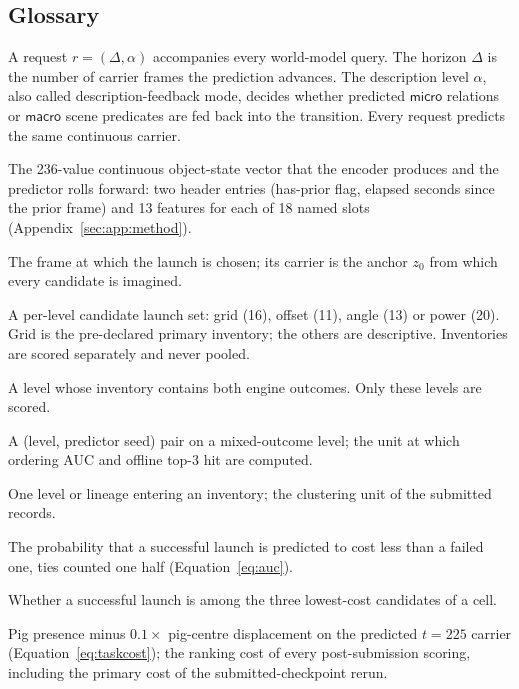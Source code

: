 \begin{revblock}
\subsection{Glossary}

\begin{description}[leftmargin=1em, itemsep=1pt]
\item[Request, horizon, description-feedback mode.] A request $r=(\Delta,\alpha)$ accompanies every world-model query. The horizon $\Delta$ is the number of carrier frames the prediction advances. The description level $\alpha$, also called description-feedback mode, decides whether predicted $\textsf{micro}$ relations or $\textsf{macro}$ scene predicates are fed back into the transition. Every request predicts the same continuous carrier.
\item[Carrier.] The 236-value continuous object-state vector that the encoder produces and the predictor rolls forward: two header entries (has-prior flag, elapsed seconds since the prior frame) and 13 features for each of 18 named slots (Appendix~\ref{sec:app:method}).
\item[Decision frame, anchor.] The frame at which the launch is chosen; its carrier is the anchor $z_0$ from which every candidate is imagined.
\item[Inventory.] A per-level candidate launch set: grid (16), offset (11), angle (13) or power (20). Grid is the pre-declared primary inventory; the others are descriptive. Inventories are scored separately and never pooled.
\item[Mixed-outcome level.] A level whose inventory contains both engine outcomes. Only these levels are scored.
\item[Cell.] A (level, predictor seed) pair on a mixed-outcome level; the unit at which ordering AUC and offline top-3 hit are computed.
\item[Member.] One level or lineage entering an inventory; the clustering unit of the submitted records.
\item[Ordering AUC.] The probability that a successful launch is predicted to cost less than a failed one, ties counted one half (Equation~\ref{eq:auc}).
\item[Offline top-3 hit.] Whether a successful launch is among the three lowest-cost candidates of a cell.
\item[Tie-free cost.] Pig presence minus $0.1\times$ pig-centre displacement on the predicted $t=225$ carrier (Equation~\ref{eq:taskcost}); the ranking cost of every post-submission scoring, including the primary cost of the submitted-checkpoint rerun.

\end{description}
\end{revblock}
